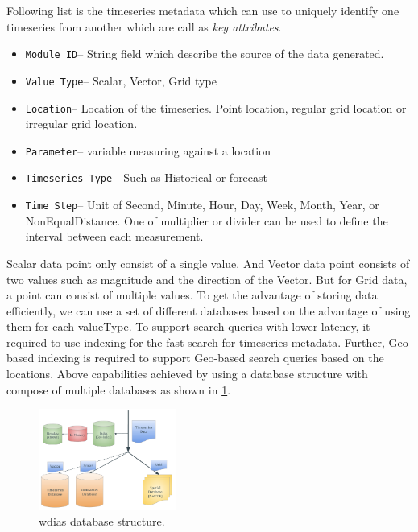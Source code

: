 \documentclass[conference]{IEEEtran}
\begin{document}
Following list is the timeseries metadata which can use to uniquely identify one timeseries from another which are call as \emph{key attributes}.

\begin{itemize}
    \item \texttt{Module ID}--  String field which describe the source of the data generated.
    \item \texttt{Value Type}--  Scalar, Vector, Grid type
    \item \texttt{Location}-- Location of the timeseries. Point location, regular grid location or irregular grid location.
    \item \texttt{Parameter}-- variable measuring against a location
    \item \texttt{Timeseries Type} - Such as Historical or forecast
    \item \texttt{Time Step}-- Unit of Second, Minute, Hour, Day, Week, Month, Year, or NonEqualDistance. One of multiplier or divider can be used to define the interval between each measurement.
\end{itemize}

Scalar data point only consist of a single value. And Vector data point consists of two values such as magnitude and the direction of the Vector. But for Grid data, a point can consist of multiple values. To get the advantage of storing data efficiently, we can use a set of different databases based on the advantage of using them for each valueType. To support search queries with lower latency, it required to use indexing for the fast search for timeseries metadata. Further, Geo-based indexing is required to support Geo-based search queries based on the locations. Above capabilities achieved by using a database structure with compose of multiple databases as shown in \cref{pfi:database_structure}.

\begin{figure}[htbp]
\centerline{\includegraphics[width=0.4\textwidth]{method/microservice/wdias_database_structure.pdf}}
\caption{\acrshort{wdias} database structure.}
\label{pfi:database_structure}
\end{figure}
\end{document}
